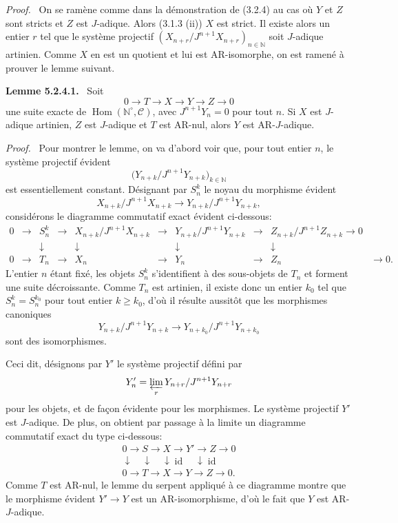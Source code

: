 \documentclass[11pt]{article}
\newenvironment{statement}[1]{\par\medskip\noindent\textbf{#1.}\ }{\par\medskip}
\newenvironment{prooftext}[1][Proof]{\par\noindent\emph{#1.}\ }{\par\medskip}
\DeclareMathOperator{\Hom}{Hom}
\providecommand{\id}{\operatorname{id}}
\providecommand{\Hom}{\operatorname{Hom}}
\providecommand{\id}{\operatorname{id}}
\providecommand{\id}{\operatorname{id}}
\providecommand{\id}{\operatorname{id}}
\providecommand{\id}{\operatorname{id}}
\providecommand{\Hom}{\operatorname{Hom}}
\providecommand{\id}{\operatorname{id}}
\begin{document}
\begin{prooftext}
On se ramène comme dans la démonstration de (3.2.4) au cas où \(Y\) et \(Z\) sont stricts et \(Z\) est \(J\)-adique. Alors (3.1.3 (ii)) \(X\) est strict. Il existe alors un entier \(r\) tel que le système projectif \((X_{n+r}/J^{n+1}X_{n+r})_{n\in\mathbb N}\) soit \(J\)-adique artinien. Comme \(X\) en est un quotient et lui est AR-isomorphe, on est ramené à prouver le lemme suivant.
\end{prooftext}

\begin{statement}{Lemme 5.2.4.1}
Soit
\[
0\longrightarrow T\longrightarrow X\longrightarrow Y\longrightarrow Z\longrightarrow0
\]
une suite exacte de \(\Hom(\mathbb N^\circ,\mathcal C)\), avec \(J^{n+1}Y_n=0\) pour tout \(n\). Si \(X\) est \(J\)-adique artinien, \(Z\) est \(J\)-adique et \(T\) est AR-nul, alors \(Y\) est AR-\(J\)-adique.
\end{statement}

\begin{prooftext}
Pour montrer le lemme, on va d'abord voir que, pour tout entier \(n\), le système projectif évident
\[
\bigl(Y_{n+k}/J^{n+1}Y_{n+k}\bigr)_{k\in\mathbb N}
\]
est essentiellement constant. Désignant par \(S_n^k\) le noyau du morphisme évident
\[
X_{n+k}/J^{n+1}X_{n+k}\longrightarrow
Y_{n+k}/J^{n+1}Y_{n+k},
\]
considérons le diagramme commutatif exact évident ci-dessous:
\[
\begin{array}{ccccccccccc}
0&\to&S_n^k&\to&X_{n+k}/J^{n+1}X_{n+k}&\to&Y_{n+k}/J^{n+1}Y_{n+k}&\to&Z_{n+k}/J^{n+1}Z_{n+k}\to0\\
&&\downarrow&&\downarrow&&\downarrow&&\downarrow\\
0&\to&T_n&\to&X_n&\to&Y_n&\to&Z_n&\to0 .
\end{array}
\]
L'entier \(n\) étant fixé, les objets \(S_n^k\) s'identifient à des sous-objets de \(T_n\) et forment une suite décroissante. Comme \(T_n\) est artinien, il existe donc un entier \(k_0\) tel que \(S_n^k=S_n^{k_0}\) pour tout entier \(k\ge k_0\), d'où il résulte aussitôt que les morphismes canoniques
\[
Y_{n+k}/J^{n+1}Y_{n+k}
\longrightarrow
Y_{n+k_0}/J^{n+1}Y_{n+k_0}
\]
sont des isomorphismes.

Ceci dit, désignons par \(Y'\) le système projectif défini par
\[
Y'_n=\varprojlim_r Y_{n+r}/J^{n+1}Y_{n+r}
\]
pour les objets, et de façon évidente pour les morphismes. Le système projectif \(Y'\) est \(J\)-adique. De plus, on obtient par passage à la limite un diagramme commutatif exact du type ci-dessous:
\[
\begin{array}{ccccc}
0\to S\to X\to Y'\to Z\to0\\
\downarrow\quad\downarrow\quad\downarrow\id\quad\downarrow\id\\
0\to T\to X\to Y\to Z\to0 .
\end{array}
\]
Comme \(T\) est AR-nul, le lemme du serpent appliqué à ce diagramme montre que le morphisme évident \(Y'\to Y\) est un AR-isomorphisme, d'où le fait que \(Y\) est AR-\(J\)-adique.
\end{prooftext}
\end{document}
